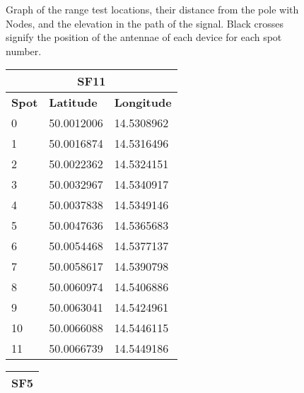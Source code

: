 
\begin{figure}[H]
    \centering
    \subfloat[SF11]{} \hfil
    \subfloat[SF5]{}
    \caption{\label{fig:range-elevation}Graph of the range test locations, their distance from the pole with Nodes, and the elevation in the path of the signal. Black crosses signify the position of the antennae of each device for each spot number.}
\end{figure}

\begin{figure}[H]
    \centering
    \begin{minipage}[t]{.45\textwidth}
        \centering
        \vspace{0em}
        \begin{tabular}{|l|l|l|}
        \multicolumn{3}{c}{\textbf{SF11}} \\ \hline
        \textbf{Spot} & \textbf{Latitude} & \textbf{Longitude} \\ \hline
        0   & 50.0012006 & 14.5308962 \\ \hline
        1   & 50.0016874 & 14.5316496 \\ \hline
        2   & 50.0022362 & 14.5324151 \\ \hline
        3   & 50.0032967 & 14.5340917 \\ \hline
        4   & 50.0037838 & 14.5349146 \\ \hline
        5   & 50.0047636 & 14.5365683 \\ \hline
        6   & 50.0054468 & 14.5377137 \\ \hline
        7   & 50.0058617 & 14.5390798 \\ \hline
        8   & 50.0060974 & 14.5406886 \\ \hline
        9   & 50.0063041 & 14.5424961 \\ \hline
        10  & 50.0066088 & 14.5446115 \\ \hline
        11  & 50.0066739 & 14.5449186 \\ \hline
        \end{tabular}
    \end{minipage}
    \begin{minipage}[t]{.45\textwidth}
        \centering
        \vspace{0em}
        \begin{tabular}{|l|l|l|}
        \multicolumn{3}{c}{\textbf{SF5}} \\ \hline

\end{tabular}
\end{minipage}
\end{figure}
